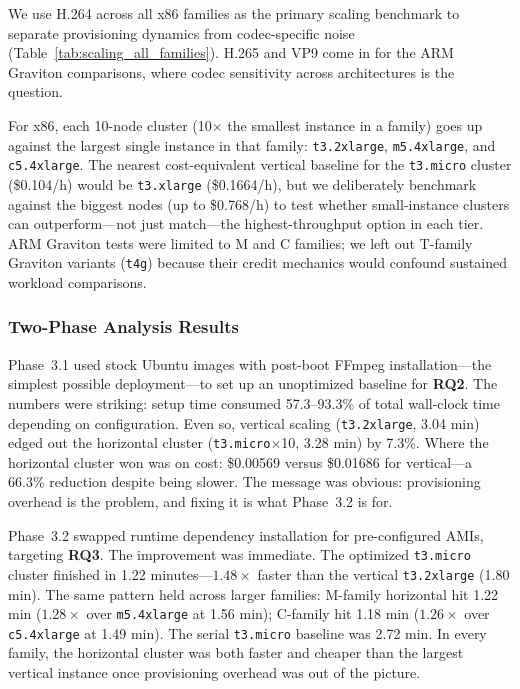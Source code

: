 \documentclass[conference]{IEEEtran}
\begin{document}
We use H.264 across all x86 families as the primary scaling benchmark to separate provisioning dynamics from codec-specific noise (Table~\ref{tab:scaling_all_families}). H.265 and VP9 come in for the ARM Graviton comparisons, where codec sensitivity across architectures is the question.

For x86, each 10-node cluster (10$\times$ the smallest instance in a family) goes up against the largest single instance in that family: \texttt{t3.2xlarge}, \texttt{m5.4xlarge}, and \texttt{c5.4xlarge}. The nearest cost-equivalent vertical baseline for the \texttt{t3.micro} cluster (\$0.104/h) would be \texttt{t3.xlarge} (\$0.1664/h), but we deliberately benchmark against the biggest nodes (up to \$0.768/h) to test whether small-instance clusters can outperform---not just match---the highest-throughput option in each tier. ARM Graviton tests were limited to M and C families; we left out T-family Graviton variants (\texttt{t4g}) because their credit mechanics would confound sustained workload comparisons.

\subsubsection{Two-Phase Analysis Results}

Phase~3.1 used stock Ubuntu images with post-boot FFmpeg installation---the simplest possible deployment---to set up an unoptimized baseline for \textbf{RQ2}. The numbers were striking: setup time consumed 57.3--93.3\% of total wall-clock time depending on configuration. Even so, vertical scaling (\texttt{t3.2xlarge}, 3.04 min) edged out the horizontal cluster (\texttt{t3.micro}$\times$10, 3.28 min) by 7.3\%. Where the horizontal cluster won was on cost: \$0.00569 versus \$0.01686 for vertical---a 66.3\% reduction despite being slower. The message was obvious: provisioning overhead is the problem, and fixing it is what Phase~3.2 is for.

Phase~3.2 swapped runtime dependency installation for pre-configured AMIs, targeting \textbf{RQ3}. The improvement was immediate. The optimized \texttt{t3.micro} cluster finished in 1.22 minutes---$1.48\times$ faster than the vertical \texttt{t3.2xlarge} (1.80 min). The same pattern held across larger families: M-family horizontal hit 1.22 min ($1.28\times$ over \texttt{m5.4xlarge} at 1.56 min); C-family hit 1.18 min ($1.26\times$ over \texttt{c5.4xlarge} at 1.49 min). The serial \texttt{t3.micro} baseline was 2.72 min. In every family, the horizontal cluster was both faster and cheaper than the largest vertical instance once provisioning overhead was out of the picture.
\end{document}
